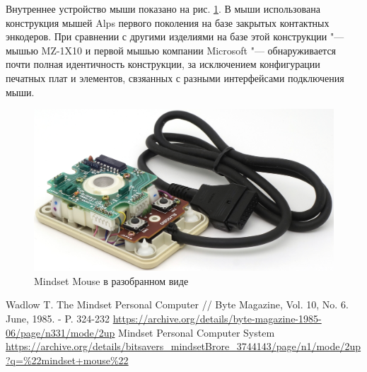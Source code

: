 \documentclass[11pt, a4paper]{article}
\begin{document}
Внутреннее устройство мыши показано на рис. \ref{fig:MindsetMouseInside}. В мыши использована конструкция мышей Alps первого поколения на базе закрытых контактных энкодеров. При сравнении с другими изделиями на базе этой конструкции "--- мышью MZ-1X10 и первой мышью компании Microsoft "--- обнаруживается почти полная идентичность конструкции, за исключением конфигурации печатных плат и элементов, свзяанных с разными интерфейсами подключения мыши.

 \begin{figure}[h]
    \centering
    \includegraphics[scale=1]{1984_mindset_mouse/inside_30.jpg}
    \caption{Mindset Mouse в разобранном виде}
    \label{fig:MindsetMouseInside}
\end{figure}



\begin{thebibliography}{9}
 Wadlow T. The Mindset Personal Computer // Byte Magazine, Vol. 10, No. 6. June, 1985. - P. 324-232 \url{https://archive.org/details/byte-magazine-1985-06/page/n331/mode/2up}
 Mindset Personal Computer System \url{https://archive.org/details/bitsavers_mindsetBrore_3744143/page/n1/mode/2up?q=%22mindset+mouse%22}
\end{thebibliography}
\end{document}
